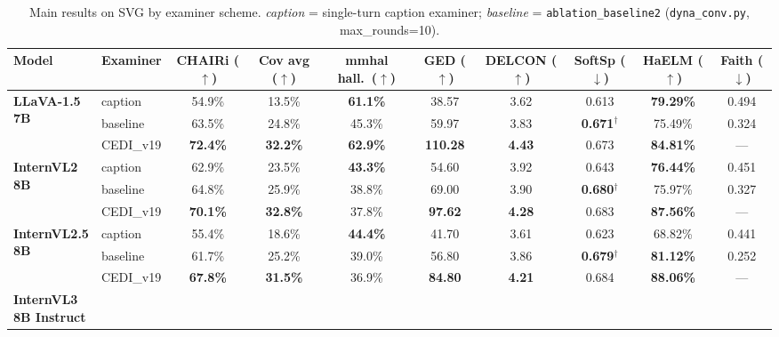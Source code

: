 \begin{table}[t]
\centering
\tiny
\caption{Main results on SVG by examiner scheme. \emph{caption} = single-turn caption examiner; \emph{baseline} = \texttt{ablation\_baseline2} (\texttt{dyna\_conv.py}, max\_rounds=10).}
\label{tab:main-exam-svg}
\begin{tabular}{@{}l|l|cccccccc@{}}
\toprule
\textbf{Model} & \textbf{Examiner} & CHAIRi ($\uparrow$) & Cov avg ($\uparrow$) & mmhal hall.\ ($\uparrow$) & GED ($\uparrow$) & DELCON ($\uparrow$) & SoftSp ($\downarrow$) & HaELM ($\uparrow$) & Faith ($\downarrow$) \\
\midrule
\multirow{3}{*}{\parbox{2.5cm}{\centering\textbf{LLaVA-1.5}\\ \textbf{7B}}}
  & caption  & 54.9\% & 13.5\% & \textbf{61.1\%} & 38.57 & 3.62 & 0.613 & \textbf{79.29\%} & 0.494 \\
  & baseline & 63.5\% & 24.8\% & 45.3\% & 59.97 & 3.83 & \textbf{0.671}$^\dagger$ & 75.49\% & 0.324 \\
\rowcolor[HTML]{E6F2FF}
  \multicolumn{1}{l}{\cellcolor[HTML]{E6F2FF}} & CEDI\_v19 & \textbf{72.4\%} & \textbf{32.2\%} & \textbf{62.9\%} & \textbf{110.28} & \textbf{4.43} & 0.673 & \textbf{84.81\%} & --- \\
\midrule
\multirow{3}{*}{\parbox{2.5cm}{\centering\textbf{InternVL2}\\ \textbf{8B}}}
  & caption  & 62.9\% & 23.5\% & \textbf{43.3\%} & 54.60 & 3.92 & 0.643 & \textbf{76.44\%} & 0.451 \\
  & baseline & 64.8\% & 25.9\% & 38.8\% & 69.00 & 3.90 & \textbf{0.680}$^\dagger$ & 75.97\% & 0.327 \\
\rowcolor[HTML]{E6F2FF}
  \multicolumn{1}{l}{\cellcolor[HTML]{E6F2FF}} & CEDI\_v19 & \textbf{70.1\%} & \textbf{32.8\%} & 37.8\% & \textbf{97.62} & \textbf{4.28} & 0.683 & \textbf{87.56\%} & --- \\
\midrule
\multirow{3}{*}{\parbox{2.5cm}{\centering\textbf{InternVL2.5}\\ \textbf{8B}}}
  & caption  & 55.4\% & 18.6\% & \textbf{44.4\%} & 41.70 & 3.61 & 0.623 & 68.82\% & 0.441 \\
  & baseline & 61.7\% & 25.2\% & 39.0\% & 56.80 & 3.86 & \textbf{0.679}$^\dagger$ & \textbf{81.12\%} & 0.252 \\
\rowcolor[HTML]{E6F2FF}
  \multicolumn{1}{l}{\cellcolor[HTML]{E6F2FF}} & CEDI\_v19 & \textbf{67.8\%} & \textbf{31.5\%} & 36.9\% & \textbf{84.80} & \textbf{4.21} & 0.684 & \textbf{88.06\%} & --- \\
\midrule
\multirow{3}{*}{\parbox{2.5cm}{\centering\textbf{InternVL3}\\ \textbf{8B Instruct}}}

\end{tabular}
\end{table}

